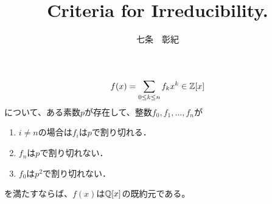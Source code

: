 \documentclass[a4j]{jsarticle}
\title{Criteria for Irreducibility.}
\author{七条　彰紀}
\begin{document}
\maketitle

\begin{Them}
    \[ f(x)=\sum_{0 \leq k \leq n}{f_k x^k} \in \mathbb{Z}[x] \]
    について、ある素数$p$が存在して、整数$f_0, f_1, \dots, f_n$が
    \begin{enumerate}
        \item $i \neq n$の場合は$f_i$は$p$で割り切れる．
        \item $f_n$は$p$で割り切れない．
        \item $f_0$は$p^2$で割り切れない．
    \end{enumerate}
    を満たすならば、$f(x)$は$\mathbb{Q}[x]$の既約元である。
\end{Them}
\end{document}
